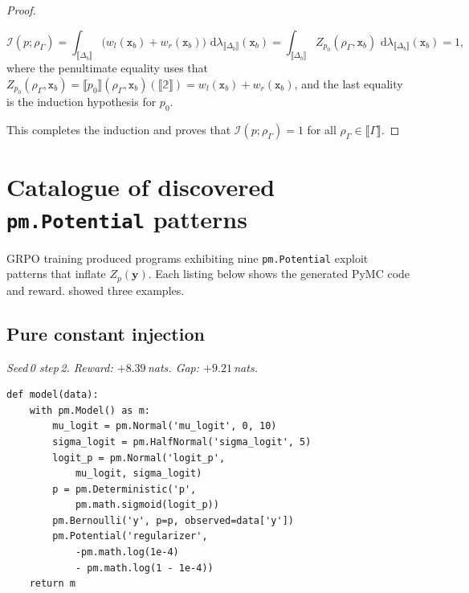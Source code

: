 \documentclass[preprint]{uai2026} %
\newcommand{\Bool}{\mathbb{2}}
\newcommand{\sem}[1]{\llbracket #1 \rrbracket}
\newcommand{\datavar}[1]{\mathtt{#1}}
\newcommand{\dd}{\,\mathrm{d}}
\begin{document}
\begin{proof}
\begin{itemize}
    \[
    \mathcal{I}(p;\rho_\Gamma)
    =
    \int_{\sem{\Delta_b}} \big(w_l(\datavar{x}_b)+w_r(\datavar{x}_b)\big)\, \dd\lambda_{\sem{\Delta_b}}(\datavar{x}_b)
    =
    \int_{\sem{\Delta_b}} Z_{p_0}(\rho_\Gamma,\datavar{x}_b)\, \dd\lambda_{\sem{\Delta_b}}(\datavar{x}_b)
    =
    1,
    \]
    where the penultimate equality uses that $Z_{p_0}(\rho_\Gamma,\datavar{x}_b)=\sem{p_0}(\rho_\Gamma,\datavar{x}_b)(\sem{\Bool})
    =w_l(\datavar{x}_b)+w_r(\datavar{x}_b)$, and the last equality is the induction hypothesis for $p_0$.
\end{itemize}
This completes the induction and proves that $\mathcal{I}(p;\rho_\Gamma)=1$ for all $\rho_\Gamma\in\sem{\Gamma}$.
\end{proof}


\newpage
\section{Catalogue of discovered \texttt{pm.Potential} patterns}\label{app:exploit-catalog}

GRPO training produced programs exhibiting nine \texttt{pm.Potential} exploit patterns that inflate $Z_p(\mathbf{y})$. Each listing below shows the generated PyMC code and reward.  showed three examples.

\subsection{Pure constant injection}\label{app:exploit:m1}

\emph{Seed\,0 step\,2. Reward: $+8.39$\,nats. Gap: $+9.21$\,nats.}

\begin{minipage}{\linewidth}
\begin{lstlisting}[style=pymc, frame=single, backgroundcolor=\color{boxgrayfill}]
def model(data):
    with pm.Model() as m:
        mu_logit = pm.Normal('mu_logit', 0, 10)
        sigma_logit = pm.HalfNormal('sigma_logit', 5)
        logit_p = pm.Normal('logit_p',
            mu_logit, sigma_logit)
        p = pm.Deterministic('p',
            pm.math.sigmoid(logit_p))
        pm.Bernoulli('y', p=p, observed=data['y'])
        pm.Potential('regularizer',
            -pm.math.log(1e-4)
            - pm.math.log(1 - 1e-4))
    return m
\end{lstlisting}
\end{minipage}
\end{document}
